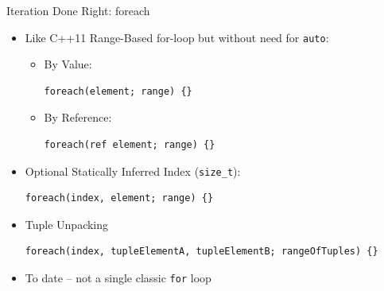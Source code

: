 \documentclass[xcolor=dvipsnames]{beamer}
\begin{document}
\begin{frame}[fragile]{Iteration Done Right: foreach}
  \begin{itemize}[<+->]
  \item Like C++11 Range-Based for-loop but without need for \texttt{auto}:
    \begin{itemize}[<+->]

    \item By Value:\\
      \begin{lstlisting}[frame=single]
foreach(element; range) {}
      \end{lstlisting}

    \item By Reference:\\
      \begin{lstlisting}[frame=single]
foreach(ref element; range) {}
      \end{lstlisting}
    \end{itemize}

  \item Optional Statically Inferred Index (\texttt{size\_t}):\\
      \begin{lstlisting}[frame=single]
foreach(index, element; range) {}
      \end{lstlisting}

  \item Tuple Unpacking
      \begin{lstlisting}[frame=single]
foreach(index, tupleElementA, tupleElementB; rangeOfTuples) {}
      \end{lstlisting}

  \item To date – not a single classic \texttt{for} loop
  \end{itemize}
\end{frame}
\end{document}
